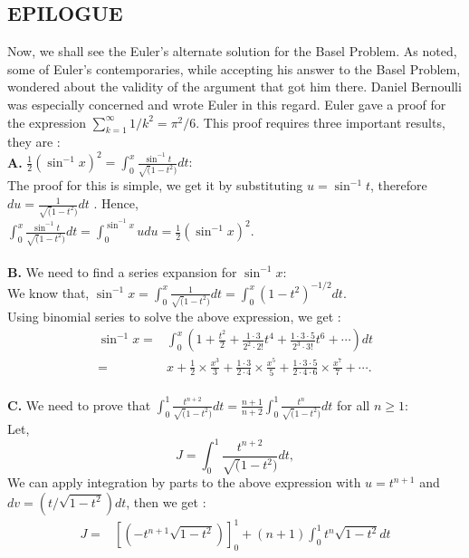 \documentclass[a4paper,reqno,11pt]{amsart}
\theoremstyle{plain}%
\begin{document}
\begin{Proof}
\section*{EPILOGUE}
Now, we shall see the Euler's alternate solution for the Basel Problem. As noted, some of Euler's contemporaries, while accepting his answer 
to the Basel Problem, wondered about the validity of the argument that got 
him there. Daniel Bernoulli was especially concerned and wrote Euler in this 
regard.\cite{ref 2}
Euler gave a proof for the expression $\sum_{k=1}^{\infty}1/k^2 = \pi^2/6.$
This proof requires three important results, they are :\\
\textbf{A.} $\frac{1}{2}(\sin^{-1}x)^2 = \int_{0}^{x} \frac{\sin^{-1}t}{\sqrt(1-t^2)}dt :$\\
The proof for this is simple, we get it by substituting $u = \sin^{-1}t$, therefore $du = \frac{1}{\sqrt(1-t^2)}dt$ . Hence,\\
$\int_{0}^{x} \frac{\sin^{-1}t}{\sqrt(1-t^2)}dt = \int_{0}^{\sin^{-1}x}u du = \frac{1}{2}(\sin^{-1}x)^2. $\\
\\
\textbf{B.} We need to find a series expansion for $\sin^{-1}x:$\\
We know that, $\sin^{-1}x = \int_{0}^{x} \frac{1}{\sqrt(1-t^2)} dt = \int_{0}^{x} (1-t^2)^{-1/2} dt.  $\\
Using binomial series to solve the above expression, we get :\\
\begin{align*}
\sin^{-1}x =& \int_{0}^{x} \left(1 + \frac{t^2}{2} + \frac{1\cdot3}{2^2\cdot2!}t^4 + \frac{1\cdot3\cdot5}{2^3\cdot3!}t^6 + \cdots\right)dt \\
=& x + \frac{1}{2} \times \frac{x^3}{3} + \frac{1\cdot3}{2\cdot4} \times \frac{x^5}{5} + \frac{1\cdot3\cdot5}{2\cdot4\cdot6} \times \frac{x^7}{7} + \cdots.
\end{align*}
\\
\textbf{C.} We need to prove that $\int_{0}^{1} \frac{t^{n+2}}{\sqrt(1-t^2)}dt = \frac{n+1}{n+2}\int_{0}^{1}\frac{t^{n}}{\sqrt(1-t^2)}dt$ for all $n \geq 1 :$ \\
Let, $$J = \int_{0}^{1} \frac{t^{n+2}}{\sqrt(1-t^2)}dt,$$
We can apply integration by parts to the above expression with $u = t^{n+1}$ and $dv = (t/\sqrt{1-t^2})dt$, then we get :\\
\begin{align*}
J =& \left[(-t^{n+1}\sqrt{1-t^2})\right]_0^{1} + (n+1)\int_{0}^{1} t^{n}\sqrt{1-t^2} dt\\

\end{align*}
\end{Proof}
\end{document}
